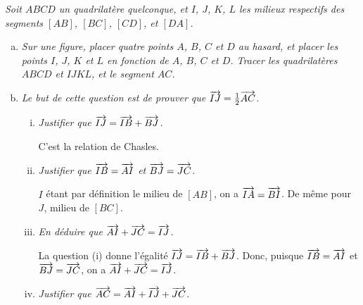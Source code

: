 \documentclass[11pt]{article}
\begin{document}
\begin{exercice}[5 points]
  \emph{Soit $ABCD$ un quadrilatère quelconque, et $I$, $J$, $K$, $L$ les milieux respectifs des segments $[AB]$, $[BC]$, $[CD]$, et $[DA]$.}
  \begin{enumerate}[(a)]
    \item \emph{Sur une figure, placer quatre points $A$, $B$, $C$ et $D$ au
      hasard, et placer les points $I$, $J$, $K$ et $L$ en fonction de $A$,
      $B$, $C$ et $D$. Tracer les quadrilatères $ABCD$ et $IJKL$, et le
      segment $AC$.}

      \begin{center}
      \end{center}
      \item \emph{Le but de cette question est de prouver que $\overrightarrow{IJ}=\frac{1}{2}\overrightarrow{AC}$.}
        \begin{enumerate}[(i)]
          \item \emph{Justifier que $\overrightarrow{IJ} = \overrightarrow{IB}+\overrightarrow{BJ}$.}

            C'est la relation de Chasles.
          \item \emph{Justifier que $\overrightarrow{IB}=\overrightarrow{AI}$ et $\overrightarrow{BJ}=\overrightarrow{JC}$.}

            $I$ étant par définition le milieu de $[AB]$, on a $\overrightarrow{IA}=\overrightarrow{BI}$. De même pour $J$, milieu de $[BC]$.
          \item \emph{En déduire que $\overrightarrow{AI}+\overrightarrow{JC}=\overrightarrow{IJ}$.}

          La question (i) donne l'égalité $\overrightarrow{IJ} = \overrightarrow{IB}+\overrightarrow{BJ}$. Donc, puisque $\overrightarrow{IB}=\overrightarrow{AI}$ et $\overrightarrow{BJ}=\overrightarrow{JC}$, on a $\overrightarrow{AI}+\overrightarrow{JC}=\overrightarrow{IJ}$.
          \item \emph{Justifier que $\overrightarrow{AC}=\overrightarrow{AI}+\overrightarrow{IJ}+\overrightarrow{JC}$.}


\end{enumerate}
\end{enumerate}
\end{exercice}
\end{document}
